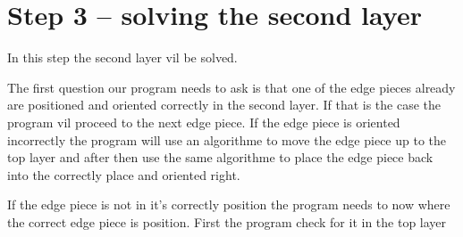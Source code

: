 \section{Step 3 -- solving the second layer}

In this step the second layer vil be solved. 

The first question our program needs to ask is that one of the edge pieces already are positioned and oriented correctly in the second layer. If that is the case the program vil proceed to the next edge piece. If the edge piece is oriented incorrectly the program will use an algorithme to move the edge piece up to the top layer and after then use the same algorithme to place the edge piece back into the correctly place and oriented right. 

If the edge piece is not in it's correctly position the program needs to now where the correct edge piece is position. First the program check for it in the top layer    

